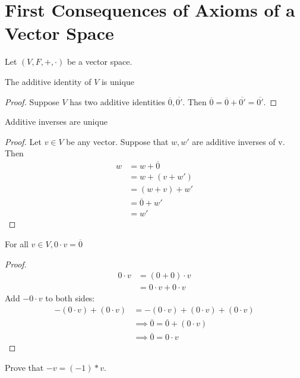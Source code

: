 \documentclass{memoir}
\begin{document}
\section{First Consequences of Axioms of a Vector Space}
Let $(V,F,+,\cdot)$ be a vector space. 
\begin{prop}
The additive identity of $V$ is unique
\end{prop}
\begin{proof}
	Suppose $V$ has two additive identities $\overline{0}, \overline{0'}$. Then $\overline{0} = \overline{0}+ \overline{0'} = \overline{0'}$.
\end{proof}

\begin{prop}
	Additive inverses are unique
\end{prop}

\begin{proof}
	Let $v\in V$ be any vector. Suppose that $w, w'$ are additive inverses of v.
	Then 
	\begin{align*}
		w &= w + \overline{0}\\
		  &= w + (v+w')\\
		  &= (w+v) + w'\\
		  &= \overline{0} + w'\\
		  &= w'
	\end{align*}
\end{proof}

\begin{prop}
	For all $v\in V, 0\cdot v = \overline{0}$
\end{prop}

\begin{proof}
	\begin{align*}
		0 \cdot v &= (0+0) \cdot v\\
			  &= 0\cdot v + 0\cdot v
	\end{align*}
	Add $-0\cdot v$ to both sides:
\begin{align*}
	-(0\cdot v) + (0\cdot v) &= -(0\cdot v) + (0\cdot v) + (0\cdot v)\\
				 &\implies \overline{0} = \overline{0} + (0\cdot v)\\
				 &\implies \overline{0} = 0\cdot v
\end{align*}
\end{proof}

\begin{hw}
	Prove that $-v = (-1)*v$.
\end{hw}
\end{document}
